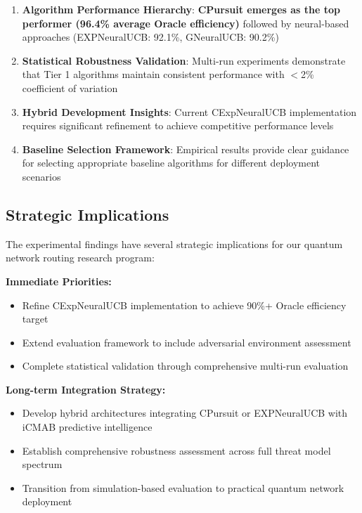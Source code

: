 \documentclass[12pt,a4paper]{article}
\newcommand{\success}[1]{\textcolor{successcolor}{\textbf{#1}}}
\begin{document}
\begin{enumerate}
\item \textbf{Algorithm Performance Hierarchy}: \success{CPursuit emerges as the top performer (96.4\% average Oracle efficiency)} followed by neural-based approaches (EXPNeuralUCB: 92.1\%, GNeuralUCB: 90.2\%)

\item \textbf{Statistical Robustness Validation}: Multi-run experiments demonstrate that Tier 1 algorithms maintain consistent performance with $<$2\% coefficient of variation

\item \textbf{Hybrid Development Insights}: Current CExpNeuralUCB implementation requires significant refinement to achieve competitive performance levels

\item \textbf{Baseline Selection Framework}: Empirical results provide clear guidance for selecting appropriate baseline algorithms for different deployment scenarios
\end{enumerate}

\subsection{Strategic Implications}

The experimental findings have several strategic implications for our quantum network routing research program:

\textbf{Immediate Priorities:}
\begin{itemize}
\item Refine CExpNeuralUCB implementation to achieve 90\%+ Oracle efficiency target
\item Extend evaluation framework to include adversarial environment assessment
\item Complete statistical validation through comprehensive multi-run evaluation
\end{itemize}

\textbf{Long-term Integration Strategy:}
\begin{itemize}
\item Develop hybrid architectures integrating CPursuit or EXPNeuralUCB with iCMAB predictive intelligence
\item Establish comprehensive robustness assessment across full threat model spectrum
\item Transition from simulation-based evaluation to practical quantum network deployment
\end{itemize}
\end{document}
